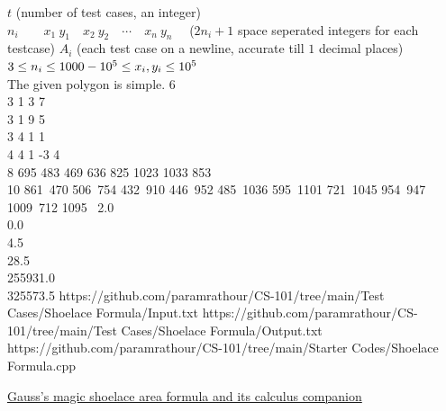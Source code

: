 \documentclass[../../Problems]{subfiles}
\begin{document}
\begin{testcasesMore}
	{$t$ \hfill(number of test cases, an integer)\\
	$n_i\qquad x_1\ y_1\quad x_2\ y_2\quad \cdots\quad  x_n\ y_n\quad$ \hfill($2n_i+1$ space seperated integers for each testcase)}
	{$A_{i}$ \hfill(each test case on a newline, accurate till $1$ decimal places)}
	{$3 \leq n_i \leq 1000\\ -10^5 \leq x_i, y_i \leq 10^5$\\
	The given polygon is simple.}
	{6\\3 1 3 7\\3 1 9 5\\3 4 1 1\\4 4 1 -3 4\\8 695 483 469 636 825 1023 1033 853\quad\\10 861\ 470 506\ 754 432\ 910 446\ 952 485\ 1036  595\ 1101 721\ 1045 954\ 947 1009\ 712 1095\ }
	{2.0\\0.0\\4.5\\28.5\\255931.0\\325573.5}
	{https://github.com/paramrathour/CS-101/tree/main/Test Cases/Shoelace Formula/Input.txt}
	{https://github.com/paramrathour/CS-101/tree/main/Test Cases/Shoelace Formula/Output.txt}
	{https://github.com/paramrathour/CS-101/tree/main/Starter Codes/Shoelace Formula.cpp}
\end{testcasesMore}
\begin{funvideo}
\href{https://youtu.be/0KjG8Pg6LGk}{Gauss's magic shoelace area formula and its calculus companion}
\end{funvideo}
\end{document}
